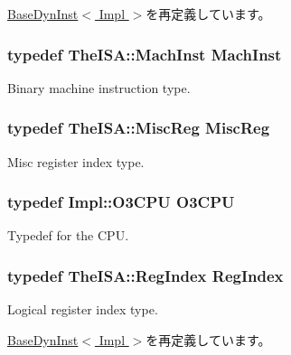 \hyperlink{classBaseDynInst_a1355cb78d031430d4d70eb5080267604}{BaseDynInst$<$ Impl $>$}を再定義しています。\hypertarget{classBaseO3DynInst_a4617f528417b8f55f809ae0988284c9b}{
\subsubsection[{MachInst}]{\setlength{\rightskip}{0pt plus 5cm}typedef TheISA::MachInst {\bf MachInst}}}
\label{classBaseO3DynInst_a4617f528417b8f55f809ae0988284c9b}
Binary machine instruction type. \hypertarget{classBaseO3DynInst_aaf5f073a387db0556d1db4bcc45428bc}{
\subsubsection[{MiscReg}]{\setlength{\rightskip}{0pt plus 5cm}typedef TheISA::MiscReg {\bf MiscReg}}}
\label{classBaseO3DynInst_aaf5f073a387db0556d1db4bcc45428bc}
Misc register index type. \hypertarget{classBaseO3DynInst_a44622cf06940413482836cb62931ac3f}{
\subsubsection[{O3CPU}]{\setlength{\rightskip}{0pt plus 5cm}typedef Impl::O3CPU {\bf O3CPU}}}
\label{classBaseO3DynInst_a44622cf06940413482836cb62931ac3f}
Typedef for the CPU. \hypertarget{classBaseO3DynInst_a36d25e03e43fa3bb4c5482cbefe5e0fb}{
\subsubsection[{RegIndex}]{\setlength{\rightskip}{0pt plus 5cm}typedef TheISA::RegIndex {\bf RegIndex}}}
\label{classBaseO3DynInst_a36d25e03e43fa3bb4c5482cbefe5e0fb}
Logical register index type. 

\hyperlink{classBaseDynInst_a36d25e03e43fa3bb4c5482cbefe5e0fb}{BaseDynInst$<$ Impl $>$}を再定義しています。

